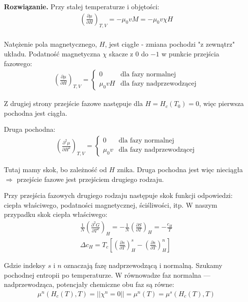 \documentclass[11pt,a4paper]{article}
\newenvironment{solution}{\vspace{1cm} \par\textbf{Rozwiązanie.} \vspace{1cm}}{}
\begin{document}
\begin{solution}
Przy stałej temperaturze i objętości:
\begin{align*}
\left( \frac{\partial \mu}{\partial H} \right)_{T,V} = 
- \mu_0 v M = - \mu_0 v \chi H \\
\end{align*}

Natężenie pola magnetycznego, $H$, jest ciągłe - zmiana pochodzi "z zewnątrz" 
układu. Podatność magnetyczna $\chi$ skacze z $0$ do $-1$ w punkcie przejścia fazowego:
\begin{align*}
\left( \frac{\partial \mu}{\partial H} \right)_{T,V} = 
\begin{cases}
0 & \text{dla fazy normalnej} \\
\mu_0 vH & \text{dla fazy nadprzewodzącej}
\end{cases}
\end{align*}

Z drugiej strony przejście fazowe następuje dla $H = H_c(T_0) = 0$,
więc pierwsza pochodna jest ciągła.

Druga pochodna:
\begin{align*}
\left( \frac{\partial^2 \mu}{\partial H^2} \right)_{T,V} = 
\begin{cases}
0 & \text{dla fazy normalnej} \\
\mu_0 v & \text{dla fazy nadprzewodzącej}
\end{cases}
\end{align*}

Tutaj mamy skok, bo zależność od $H$ znika. Druga pochodna jest więc nieciągła
$\Rightarrow$ przejście fazowe jest przejściem drugiego rodzaju.

Przy przejścia fazowych drugiego rodzaju następuje skok funkcji odpowiedzi:
ciepła właściwego, podatności magnetycznej, ściśliwości, itp. W naszym przypadku
skok ciepła właściwego:
\begin{align*}
\frac{1}{N}\left( \frac{\partial^2 G}{\partial T^2} \right)_H = 
-\frac{1}{N}\left( \frac{\partial S}{\partial T} \right)_H = -\frac{c_H}{T} \\
\Delta c_H = T_{c} \left[
\left( \frac{\partial s}{\partial T} \right)_H^{s} - 
\left( \frac{\partial s}{\partial T} \right)_H^{n} \right] 
\end{align*}

Gdzie indeksy $s$ i $n$ oznaczają fazę nadprzewodzącą i normalną.
Szukamy pochodnej entropii po temperaturze. 
W równowadze faz normalna --- nadprzewodząca, potencjały chemiczne obu faz są równe:
\begin{align*}
\mu^{n}(H_c(T),T) = 
|| \chi^{n} = 0 || = \mu^{n}(T) = 
\mu^{s}(H_c(T),T)
\end{align*}


\end{solution}
\end{document}
